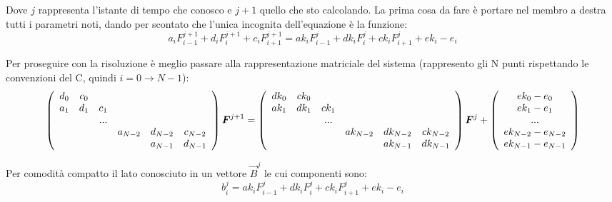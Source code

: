 Dove $j$ rappresenta l'istante di tempo che conosco e $j+1$ quello che sto calcolando. La prima cosa da fare \`e portare nel membro a destra tutti i parametri noti, dando per scontato che l'unica incognita dell'equazione \`e la funzione:
\begin{equation}\label{eq:step}
  a_{i} F_{i-1}^{j+1}+d_i F_{i}^{j+1} +c_{i}F_{i+1}^{j+1}= 
  ak_i F_{i-1}^{j}+ dk_i F_{i}^{j} + ck_i F_{i+1}^{j} + ek_i - e_i
\end{equation}

Per proseguire con la risoluzione \`e meglio passare alla rappresentazione matriciale del sistema (rappresento gli N punti rispettando le convenzioni del C, quindi $i=0\to N-1$):
\begin{equation}
  \left( \begin{array}{cccccc}
      d_0&c_0&&&\\
      a_1&d_1&c_1&\\
      &&...&&&\\
      &&&a_{N-2}&d_{N-2}&c_{N-2}\\
      &&&&a_{N-1}&d_{N-1}\\
  \end{array} \right)\boldsymbol{F}^{j+1} = 
  \left( \begin{array}{cccccc}
      dk_0&ck_0&&&&\\
      ak_1&dk_1&ck_1&&&\\
      &&...&&&\\
      &&&ak_{N-2}&dk_{N-2}&ck_{N-2}\\
      &&&&ak_{N-1}&dk_{N-1}\\
  \end{array} \right) \boldsymbol{F}^{j} + 
  \left( \begin{array}{c}
      ek_0 - e_0\\
      ek_1 - e_1\\
      ...\\
      ek_{N-2} - e_{N-2}\\
      ek_{N-1} - e_{N-1}\\
  \end{array} \right)
\end{equation}

Per comodit\`a compatto il lato conosciuto in un vettore $\vec{B}^j$ le cui componenti sono:
\begin{equation}\label{eq:bi}
  b_i^j = ak_i F_{i-1}^{j}+ dk_i F_{i}^{j} + ck_i F_{i+1}^{j} + ek_i-e_i
\end{equation}

